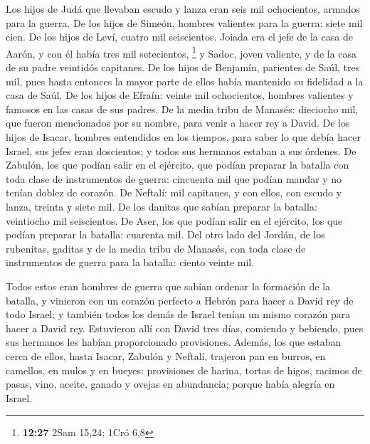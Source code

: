 \begin{paracol}{2}
 Los hijos de Judá que llevaban escudo y lanza eran seis
mil ochocientos, armados para la guerra.  De los hijos de
Simeón, hombres valientes para la guerra: siete mil cien.
 De los hijos de Leví, cuatro mil seiscientos.
 Joiada era el jefe de la casa de Aarón, y con él había
tres mil setecientos, \footnote{\textbf{12:27} 2Sam 15,24; 1Cró 6,8}
 y Sadoc, joven valiente, y de la casa de su padre
veintidós capitanes.  De los hijos de Benjamín, parientes
de Saúl, tres mil, pues hasta entonces la mayor parte de ellos había
mantenido su fidelidad a la casa de Saúl.  De los hijos
de Efraín: veinte mil ochocientos, hombres valientes y famosos en las
casas de sus padres.  De la media tribu de Manasés:
dieciocho mil, que fueron mencionados por su nombre, para venir a hacer
rey a David.  De los hijos de Isacar, hombres entendidos
en los tiempos, para saber lo que debía hacer Israel, sus jefes eran
doscientos; y todos sus hermanos estaban a sus órdenes. 
De Zabulón, los que podían salir en el ejército, que podían preparar la
batalla con toda clase de instrumentos de guerra: cincuenta mil que
podían mandar y no tenían doblez de corazón.  De Neftalí:
mil capitanes, y con ellos, con escudo y lanza, treinta y siete mil.
 De los danitas que sabían preparar la batalla:
veintiocho mil seiscientos.  De Aser, los que podían
salir en el ejército, los que podían preparar la batalla: cuarenta mil.
 Del otro lado del Jordán, de los rubenitas, gaditas y de
la media tribu de Manasés, con toda clase de instrumentos de guerra para
la batalla: ciento veinte mil.

 Todos estos eran hombres de guerra que sabían ordenar la
formación de la batalla, y vinieron con un corazón perfecto a Hebrón
para hacer a David rey de todo Israel; y también todos los demás de
Israel tenían un mismo corazón para hacer a David rey. 
Estuvieron allí con David tres días, comiendo y bebiendo, pues sus
hermanos les habían proporcionado provisiones.  Además,
los que estaban cerca de ellos, hasta Isacar, Zabulón y Neftalí,
trajeron pan en burros, en camellos, en mulos y en bueyes: provisiones
de harina, tortas de higos, racimos de pasas, vino, aceite, ganado y
ovejas en abundancia; porque había alegría en Israel.

\switchcolumn
\begin{otherlanguage}{english}


\end{otherlanguage}
\end{paracol}

